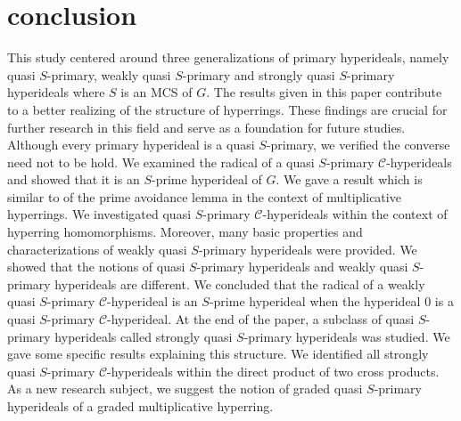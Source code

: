 \documentclass[preprint,review,10pt]{amsart}
\theoremstyle{definition}
\newtheorem{definition}[theorem]{Definition}
\theoremstyle{remark}
\numberwithin{equation}{section}
\begin{document}
\section{conclusion}
This study centered around three generalizations of primary hyperideals, namely quasi $S$-primary, weakly quasi $S$-primary and  strongly quasi $S$-primary hyperideals where $S$ is an MCS of $G$.  The results given in this paper contribute to a better realizing of the structure of hyperrings. These findings are crucial  for
further research in this field and serve as a  foundation for future studies. 
Although every primary hyperideal is a quasi $S$-primary, we verified the converse need not to be hold. We examined the radical of a quasi $S$-primary $\mathcal{C}$-hyperideals and showed that it is an  $S$-prime hyperideal of $G$. We gave  a result which is similar to of the prime avoidance lemma in the context of multiplicative hyperrings. We investigated  quasi  $S$-primary $\mathcal{C}$-hyperideals within the context of hyperring homomorphisms. Moreover, many basic properties and characterizations of weakly quasi $S$-primary hyperideals were provided. We showed that the notions of quasi $S$-primary hyperideals and weakly quasi $S$-primary hyperideals are different. We concluded that the radical of a weakly quasi $S$-primary $\mathcal{C}$-hyperideal is an $S$-prime hyperideal when the hyperideal $0$ is a quasi $S$-primary $\mathcal{C}$-hyperideal.
At the end of the paper, a subclass of quasi $S$-primary hyperideals called strongly quasi $S$-primary hyperideals was studied. We gave  some  specific results explaining this   structure. We identified all strongly quasi $S$-primary $\mathcal{C}$-hyperideals within the direct product of two cross products. As a new research subject, we suggest the notion  of graded quasi $S$-primary hyperideals of a graded multiplicative hyperring.
\end{document}
